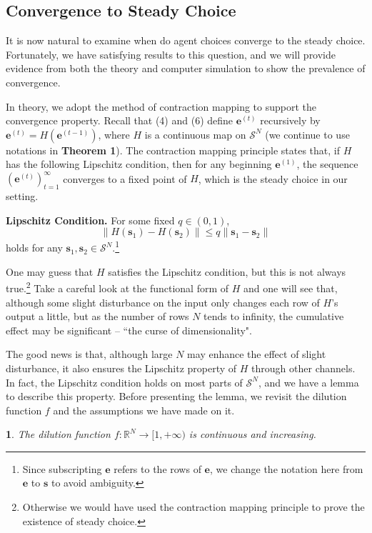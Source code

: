 \documentclass[12pt,english]{article}
\theoremstyle{plain}
\newtheorem{assumption}{\protect\assumptionname}
\theoremstyle{plain}
\providecommand{\assumptionname}{Assumption}
\begin{document}
	\subsection{Convergence to Steady Choice}
	It is now natural to examine when do agent choices converge to the steady choice. Fortunately, we have satisfying results to this question, and we will provide evidence from both the theory and computer simulation to show the prevalence of convergence.\par 
	
	In theory, we adopt the method of contraction mapping to support the convergence property. Recall that (4) and (6) define $\mathbf{e}^{(t)}$ recursively by $\mathbf{e}^{(t)} = H(\mathbf{e}^{(t - 1)})$, where $H$ is a continuous map on $\mathcal{S}^N$ (we continue to use notations in \textbf{Theorem 1}). The contraction mapping principle states that, if $H$ has the following Lipschitz condition, then for any beginning $\mathbf{e}^{(1)}$, the sequence $\left(\mathbf{e}^{(t)}\right)_{t = 1}^{\infty}$ converges to a fixed point of $H$, which is the steady choice in our setting.\par \newpage
	\noindent \textbf{Lipschitz Condition.} For some fixed $q\in (0, 1)$, 
	\begin{equation}
		\lVert H(\mathbf{s}_1) - H(\mathbf{s}_2)\rVert \leqslant q\lVert \mathbf{s}_1 - \mathbf{s}_2\rVert
	\end{equation}
	holds for any $\mathbf{s}_1, \mathbf{s}_2 \in \mathcal{S}^N$.\footnote{Since subscripting $\mathbf{e}$ refers to the rows of $\mathbf{e}$, we change the notation here from $\mathbf{e}$ to $\mathbf{s}$ to avoid ambiguity.}
	
	One may guess that $H$ satisfies the Lipschitz condition, but this is not always true.\footnote{Otherwise we would have used the contraction mapping principle to prove the existence of steady choice.} Take a careful look at the functional form of $H$ and one will see that, although some slight disturbance on the input only changes each row of $H$'s output a little, but as the number of rows $N$ tends to infinity, the cumulative effect may be significant -- ``the curse of dimensionality".\par
	
	The good news is that, although large $N$ may enhance the effect of slight disturbance, it also ensures the Lipschitz property of $H$ through other channels. In fact, the Lipschitz condition holds on most parts of $\mathcal{S}^N$, and we have a lemma to describe this property. Before presenting the lemma, we revisit the dilution function $f$ and the assumptions we have made on it.
	\begin{assumption}
		The dilution function $f: \mathbb{R}^N \to [1, +\infty)$ is continuous and increasing.
	\end{assumption}
	
\end{document}
